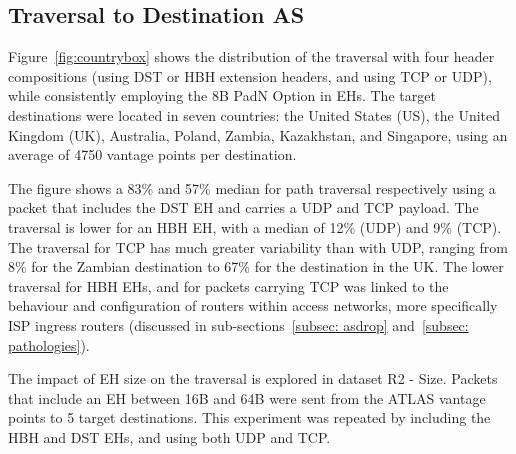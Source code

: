 \documentclass[conference]{IEEEtran}
\begin{document}

\subsection{Traversal to Destination AS}


Figure~\ref{fig:countrybox} shows the distribution of the traversal with
four header compositions (using DST or HBH extension headers, and
using TCP or UDP), while consistently employing the 8B PadN Option in EHs.  The target
destinations were located in seven countries: the United States (US), the
United Kingdom (UK), Australia, Poland, Zambia, Kazakhstan, and Singapore, using
an average of 4750 vantage points per destination.

The figure shows a 83\% and 57\% median for path traversal 
respectively using a packet that includes the
DST EH and carries a UDP and TCP payload.  The traversal is lower
for an HBH EH, with a median of 12\% (UDP) and 9\% (TCP). The traversal
 for TCP has much greater variability than with
UDP, ranging from 8\% for the Zambian destination to 67\% for the destination in the
UK. The lower traversal for HBH EHs, and for packets carrying TCP
was  linked to the
behaviour and configuration of routers within access networks, more
specifically ISP ingress routers (discussed in sub-sections~\ref{subsec: asdrop} and~\ref{subsec: pathologies}).

The impact of EH size on the traversal is explored in dataset R2 - Size. Packets that include an EH between 16B and 64B were sent from the ATLAS vantage points to 5 target destinations.  This experiment was repeated by including the
HBH and DST EHs, and using both UDP and TCP. 

\end{document}
